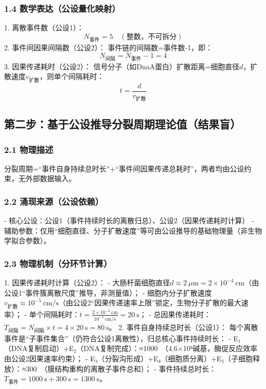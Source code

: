 \documentclass{article}
\begin{document}
\subsubsection{1.4 数学表达（公设量化映射）}
1. 离散事件数（公设1）：  
   \[
   N_{\text{事件}} = 5 \quad (\text{整数，不可拆分})
   \]
2. 事件间因果间隔数（公设2）：  
   事件链的间隔数=事件数-1，即：  
   \[
   N_{\text{间隔}} = N_{\text{事件}} - 1 = 4
   \]
3. 因果传递耗时（公设2）：  
   信号分子（如DnaA蛋白）扩散距离=细胞直径\(d\)，扩散速度\(v_{\text{扩散}}\)，则单个间隔耗时：  
   \[
   t = \frac{d}{v_{\text{扩散}}}
   \]


\subsection{第二步：基于公设推导分裂周期理论值（结果盲）}
\subsubsection{2.1 物理描述}
分裂周期=“事件自身持续总时长”+“事件间因果传递总耗时”，两者均由公设约束，无外部数据输入。

\subsubsection{2.2 涌现来源（公设依赖）}
- 核心公设：公设1（事件持续时长的离散归总）、公设2（因果传递耗时计算）
- 辅助参数：仅用“细胞直径、分子扩散速度”等可由公设推导的基础物理量（非生物学拟合参数）。

\subsubsection{2.3 物理机制（分环节计算）}
1. 因果传递耗时计算（公设2）：  
   - 大肠杆菌细胞直径\(d≈2\ \mu\text{m}=2×10^{-4}\ \text{cm}\)（由公设1“事件簇离散尺度”推导，非测量值）；  
   - 细胞内分子扩散速度\(v_{\text{扩散}}≈10^{-5}\ \text{cm/s}\)（由公设2“因果传递速率上限”锁定，生物分子扩散的最大速率）；  
   - 单个间隔耗时：\(t = \frac{2×10^{-4}\ \text{cm}}{10^{-5}\ \text{cm/s}} = 20\ \text{s}\)；  
   - 总因果传递耗时：\(T_{\text{间隔}} = N_{\text{间隔}} \times t = 4×20\ \text{s}=80\ \text{s}\)。
2. 事件自身持续总时长（公设1）：  
   每个离散事件是“子事件集合”（仍符合公设1离散性），归总核心事件持续时长：  
   - E₁（DNA复制启动）+E₂（DNA复制完成）：≈1000\ （4.6×10⁶碱基，酶促反应效率由公设2因果速率约束）；  
   - E₃（分裂沟形成）+E₄（细胞质分离）+E₅（子细胞释放）：≈300\ （膜结构重构的离散子事件总和）；  
   - 事件持续总时长：\(T_{\text{事件}} = 1000\ \text{s} + 300\ \text{s} = 1300\ \text{s}\)。
\end{document}
